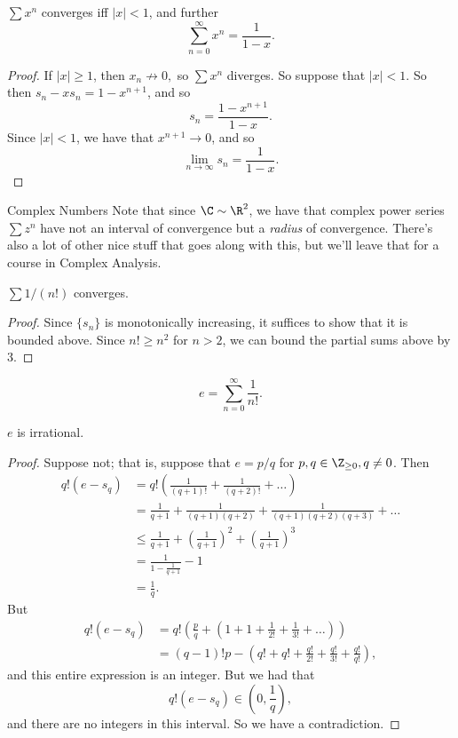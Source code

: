 \documentclass{notes}
\begin{document}
\begin{theorem}
  $\sum x^n$ converges iff $|x| < 1$, and further $$\sum_{n=0}^\infty x^n = \frac{1}{1 - x}.$$
\end{theorem}
\begin{proof}
  If $|x| \geq 1$, then $x_n \not\to 0,$ so $\sum x^n$ diverges. So suppose that $|x| < 1.$ So then
  $s_{n} - xs_n = 1 - x^{n+1}$, and so $$s_n = \frac{1 - x^{n+1}}{1 - x}.$$ Since $|x| < 1$, we have
  that $x^{n+1} \to 0$, and so $$\lim_{n\to\infty} s_n = \frac{1}{1-x}.$$
\end{proof}

\begin{aside}{Complex Numbers}
Note that since $\C \sim \R^2$, we have that complex power series $\sum z^n$ have not an interval of 
convergence but a \emph{radius} of convergence. There's also a lot of other nice stuff that goes along 
with this, but we'll leave that for a course in Complex Analysis.
\end{aside}

\begin{lemma}
  $\sum 1/(n!)$ converges.
\end{lemma}
\begin{proof}
  Since $\{s_n\}$ is monotonically increasing, it suffices to show that it is bounded above. Since 
  $n! \geq n^2$ for $n > 2$, we can bound the partial sums above by 3.
\end{proof}

\begin{defn}[$e$]
  $$e = \sum_{n=0}^\infty \frac{1}{n!}.$$
\end{defn}

\begin{theorem}
  $e$ is irrational.
\end{theorem}
\begin{proof}
  Suppose not; that is, suppose that $e = p/q$ for $p,q \in \Z_{\geq 0}, q\neq 0$. Then 
  \begin{align*}
    q! (e - s_q) &= q! \left( \frac{1}{(q + 1)!} + \frac{1}{(q + 2)!} + \dots \right) \\
                 &= \frac{1}{q + 1} + \frac{1}{(q+1)(q+2)} + \frac{1}{(q+1)(q+2)(q+3)} + \dots \\
                 &\leq \frac{1}{q + 1} + \left( \frac{1}{q + 1} \right)^2 + \left( \frac{1}{q + 1} \right)^3 \\
                 &= \frac{1}{1 - \frac{1}{q + 1}} - 1 \\
                 &= \frac{1}{q}.
  \end{align*}
  But
  \begin{align*}
    q!(e - s_q) &= q! \left( \frac{p}{q} + \left( 1 + 1 + \frac{1}{2!} + \frac{1}{3!} + \dots \right) \right) \\
                &= (q-1)!p - \left( q! + q! + \frac{q!}{2!} + \frac{q!}{3!} + \frac{q!}{q!} \right),
  \end{align*}
  and this entire expression is an integer. But we had that $$q!(e - s_q) \in \left( 0, \frac{1}{q} \right),$$
  and there are no integers in this interval. So we have a contradiction.
\end{proof}
\end{document}
